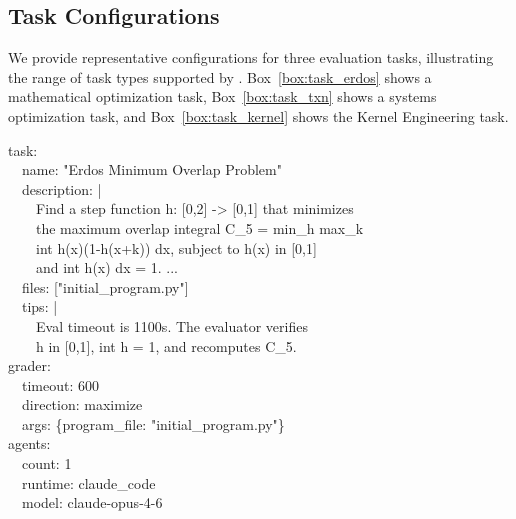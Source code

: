 \subsection{Task Configurations}
\label{app:task_configs}

We provide representative configurations for three evaluation tasks, illustrating the range of task types supported by \method{}. Box~\ref{box:task_erdos} shows a mathematical optimization task, Box~\ref{box:task_txn} shows a systems optimization task, and Box~\ref{box:task_kernel} shows the Kernel Engineering task.

\begin{promptbox}
\label{box:task_erdos}
\ttfamily\scriptsize
task:\\
~~name: "Erdos Minimum Overlap Problem"\\
~~description: |\\
~~~~Find a step function h: [0,2] -> [0,1] that minimizes\\
~~~~the maximum overlap integral C\_5 = min\_h max\_k\\
~~~~int h(x)(1-h(x+k)) dx, subject to h(x) in [0,1]\\
~~~~and int h(x) dx = 1. ...\\
~~files: ["initial\_program.py"]\\
~~tips: |\\
~~~~Eval timeout is 1100s. The evaluator verifies\\
~~~~h in [0,1], int h = 1, and recomputes C\_5.\\
grader:\\
~~timeout: 600\\
~~direction: maximize\\
~~args: \{program\_file: "initial\_program.py"\}\\
agents:\\
~~count: 1\\
~~runtime: claude\_code\\
~~model: claude-opus-4-6
\end{promptbox}


